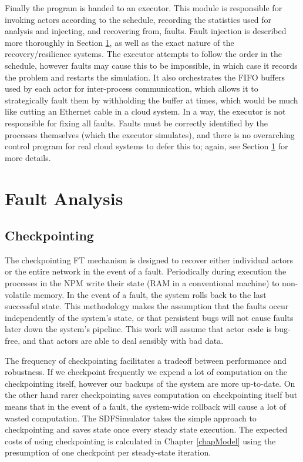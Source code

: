 Finally the program is handed to an executor.
This module is responsible for invoking actors according to the schedule, recording the statistics used for analysis and injecting, and recovering from, faults.
Fault injection is described more thoroughly in Section \ref{secSystemFault}, as well as the exact nature of the recovery/resilience systems.
The executor attempts to follow the order in the schedule, however faults may cause this to be impossible, in which case it records the problem and restarts the simulation.
It also orchestrates the FIFO buffers used by each actor for inter-process communication, which allows it to strategically fault them by withholding the buffer at times, which would be much like cutting an Ethernet cable in a cloud system.
In a way, the executor is not responsible for fixing all faults.
Faults must be correctly identified by the processes themselves (which the executor simulates), and there is no overarching control program for real cloud systems to defer this to; again, see Section \ref{secSystemFault} for more details.

\section{Fault Analysis}
\label{secSystemFault}
\subsection{Checkpointing}

The checkpointing FT mechanism is designed to recover either individual actors or the entire network in the event of a fault.
Periodically during execution the processes in the NPM write their state (RAM in a conventional machine) to non-volatile memory.
In the event of a fault, the system rolls back to the last successful state.
This methodology makes the assumption that the faults occur independently of the system's state, or that persistent bugs will not cause faults later down the system's pipeline.
This work will assume that actor code is bug-free, and that actors are able to deal sensibly with bad data.

The frequency of checkpointing facilitates a tradeoff between performance and robustness.
If we checkpoint frequently we expend a lot of computation on the checkpointing itself, however our backups of the system are more up-to-date.
On the other hand rarer checkpointing saves computation on checkpointing itself but means that in the event of a fault, the system-wide rollback will cause a lot of wasted computation.
The SDFSimulator takes the simple approach to checkpointing and saves state once every steady state execution.
The expected costs of using checkpointing is calculated in Chapter \ref{chapModel} using the presumption of one checkpoint per steady-state iteration.

